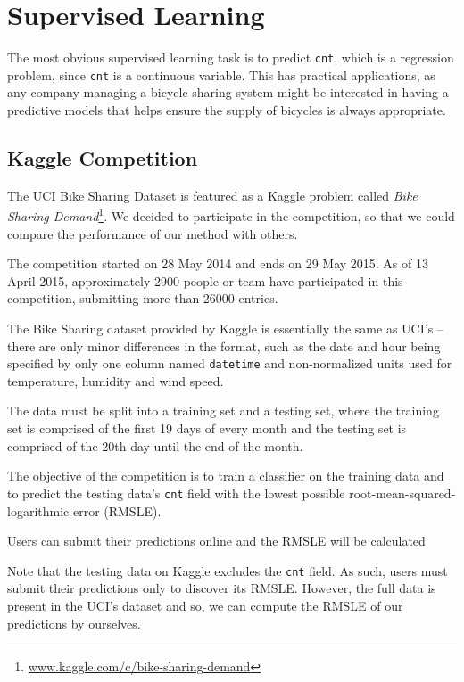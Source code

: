 \documentclass[12pt]{article}
\begin{document}
\section{Supervised Learning}
\label{supervised learning}

The most obvious supervised learning task is to predict \texttt{cnt}, which is a regression problem, since \texttt{cnt} is a continuous variable. This has practical applications, as any company managing a bicycle sharing system might be interested in having a predictive models that helps ensure the supply of bicycles is always appropriate.

\subsection{Kaggle Competition}

The UCI Bike Sharing Dataset is featured as a Kaggle problem called \emph{Bike Sharing Demand}\footnote{\url{www.kaggle.com/c/bike-sharing-demand}}. We decided to participate in the competition, so that we could compare the performance of our method with others.

The competition started on 28 May 2014 and ends on 29 May 2015. As of 13 April 2015, approximately 2900 people or team have participated in this competition, submitting more than 26000 entries.

The Bike Sharing dataset provided by Kaggle is essentially the same as UCI's -- there are only minor differences in the format, such as the date and hour being specified by only one column named \texttt{datetime} and non-normalized units used for temperature, humidity and wind speed.

The data must be split into a training set and a testing set, where the training set is comprised of the first 19 days of every month and the testing set is comprised of the 20th day until the end of the month.

The objective of the competition is to train a classifier on the training data and to predict the testing data's \texttt{cnt} field with the lowest possible root-mean-squared-logarithmic error (RMSLE).

Users can submit their predictions online and the RMSLE will be calculated

Note that the testing data on Kaggle excludes the \texttt{cnt} field. As such, users must submit their predictions only to discover its RMSLE. However, the full data is present in the UCI's dataset and so, we can compute the RMSLE of our predictions by ourselves.
\end{document}
